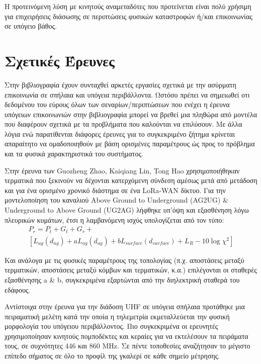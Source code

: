 \documentclass[12pt, greek]{article}
\begin{document}
\begin{multicols*}{2}
        Η προτεινόμενη λύση με κινητούς αναμεταδότες που προτείνεται είναι πολύ χρήσιμη
        για επιχειρήσεις διάσωσης σε περιπτώσεις φυσικών καταστροφών ή/και επικοινωνίας σε
        υπόγειο βάθος.

    \section{\normalsize \textsf{Σχετικές Έρευνες}} Στην βιβλιογραφία έχουν συνταχθεί
        αρκετές εργασίες σχετικά με την ασύρματη επικοινωνία σε σπήλαια και υπόγεια
        περιβάλλοντα. Ωστόσο πρέπει να σημειωθεί οτι δεδομένου του εύρους όλων των 
        σεναρίων/περιπτώσεων που ενέχει η έρευνα υπόγειων επικοινωνιών στην βιβλιογραφία
        μπορεί να βρεθεί μια πληθώρα από μοντέλα που διαφέρουν σχετικά με τα προβλήματα που
        καλούνται να επιλύσουν. Με άλλα λόγια ενώ παρατίθενται διάφορες έρευνες για το 
        συγκεκριμένο ζήτημα κρίνεται απαραίτητο να ομαδοποιηθούν με βάση ορισμένες παραμέτρους
        ώς προς το πρόβλημα και τα φυσικά χαρακτηριστικά του συστήματος.
        
        Στην έρευνα των Guozheng Zhao, Kaiqiang Lin, Tong Hao \cite{zhao_feasibility_2023}
        χρησιμοποιήθηκαν τερματικά που ξεκινούν να δέχονται κατερχόμενη σύνδεση αμέσως μετά 
        από μετάδοση και για ένα ορισμένο χρονικό διάστημα σε ένα LoRa-WAN δίκτυο.
        Για την μοντελοποίηση του καναλιού Above Ground to Underground (AG2UG) \& 
        Underground to Above Ground (UG2AG) λήφθηκε υπ'όψη και εξασθένηση λόγω πλευρικών
        κυμάτων, έτσι η λαμβανόμενη ισχύς υπολογίζεται από τον τύπο:\\
        \begin{multline} \label{eq:1}
            P_r = P_t + G_t + G_r + \\ 
                [L_{ug}(d_{ug}) + aL_{ag}(d_{ag}) + bL_{surface}(d_{surface}) + L_R - 10\log\chi^2]
        \end{multline}
        
        Και ανάλογα με τις φυσικές παραμέτρους της τοπολογίας (π.χ. αποστάσεις μεταξύ
        τερματικών, αποστάσεις μεταξύ κόμβων και τερματικών, κ.α.) επιλέγονται οι 
        σταθερές εξασθένησης a \& b, συγκεκριμένα εξαρτώνται από την διηλεκτρική 
        σταθερά του εδάφους.

        Αντίστοιχα στην έρευνα για την διάδοση UHF σε υπόγεια σπήλαια \cite{rak_uhf_2007}
        προτάθηκε μια πειραματική μελέτη κατά την οποία η τηλεμετρία εκμεταλλεύεται την φυσική
        μορφολογία του υπόγειου περιβάλλοντος. Πιο συγκεκριμένα οι ερευνητές χρησιμοποίησαν
        κινητούς πομποδέκτες και κεραίες για να εκτελέσουν τα πειράματα τους, σε συχνότητες 
        446 και 860 MHz. Σε πέντε τοποθεσίες αναζήτησαν το μέγιστο επίπεδο σήματος σε όλο το
        προφίλ της γκαλερί σε κάθε σημείο μέτρησης.


\end{multicols*}
\end{document}
